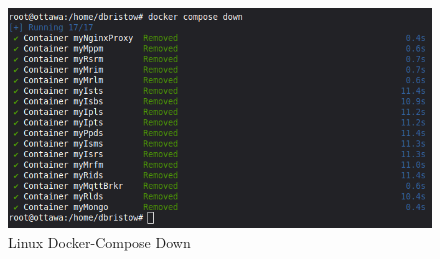 \begin{figure}[H]
    \centering
    \includegraphics[scale=0.5]{../Images/docker-compose-down-linux.png}
    \caption{Linux Docker-Compose Down}
    \label{fig:linux-docker-cmds-4}
\end{figure}
